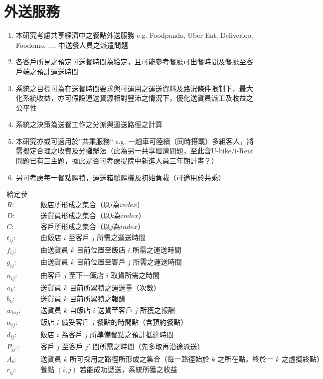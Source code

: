 \documentclass{article}
\begin{document}
\section*{外送服務}

\begin{enumerate}
  \def\labelenumi{\arabic{enumi}.}
  \item 本研究考慮共享經濟中之餐點外送服務 e.g. Foodpanda, Uber Eat, Deliverloo, Foodomo, ..., 中送餐人員之派遣問題
  \item 各客戶所見之預定可送餐時間為給定，且可能參考餐廳可出餐時間及餐廳至客戶端之預計運送時間
  \item 系統之目標可為在送餐時間要求與可運用之運送資料及路況條件限制下，最大化系統收益，亦可假設運送資源相對豐沛之情況下，優化送貨員派工及收益之公平性
  \item 系統之決策為送餐工作之分派與運送路徑之計算
  \item 本研究亦或可適用於”共乘服務“ e.g. 一趟車可陸續（同時搭載）多組客人，將需擬定合理之收費及分攤辦法（此為另一共享經濟問題，至此含U-bike/i-Rent問題已有三主題，據此是否可考慮提院中新進人員三年期計畫？）
  \item 另可考慮每一餐點體積，運送箱總體機及初始負載（可適用於共乘）
\end{enumerate}

\begin{align*}
  \text{給定參數：}\\
  R: & \text{飯店所形成之集合（以$i$為$index$）} \\
  D: & \text{送貨員形成之集合（以$k$為$index$）} \\
  C: & \text{客戶所形成之集合（以$j$為$index$）} \\
  t_{ij}: & \text{由飯店 $i$ 至客戶 $j$ 所需之運送時間} \\
  f_{ij}: & \text{由送貨員 $k$ 目前位置至飯店 $i$ 所需之運送時間} \\
  g_{ij}: & \text{由送貨員 $k$ 目前位置至客戶 $j$ 所需之運送時間} \\
  n_{ij}: & \text{由客戶 $j$ 至下一飯店 $i$ 取貨所需之時間} \\
  a_k: & \text{送貨員 $k$ 目前所累積之運送量（次數）} \\
  b_k: & \text{送貨員 $k$ 目前所累積之報酬} \\
  w_{kij}: & \text{送貨員 $k$ 自飯店 $i$ 送貨至客戶 $j$ 所獲之報酬} \\
  \alpha_{ij}: & \text{飯店 $i$ 備妥客戶 $j$ 餐點的時間點（含預約餐點）} \\
  d_{ij}: & \text{飯店 $i$ 為客戶 $j$ 所準備餐點之預計抵達時間} \\
  P_{jj'}: & \text{客戶 $j$ 至客戶 $j'$ 間所需之時間（先多取再沿途派送）} \\
  A_k: & \text{送貨員 $k$ 所可採用之路徑所形成之集合（每一路徑始於 $k$ 之所在點，終於一 $k$ 之虛擬終點）} \\
  r_{ij}: & \text{餐點 $(i, j)$ 若能成功遞送，系統所獲之收益}
\end{align*}
\end{document}
